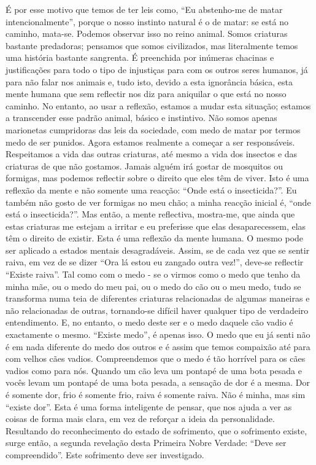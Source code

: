 É por esse motivo que temos de ter leis como, “Eu
abstenho-me de matar intencionalmente”, porque o nosso
instinto natural é o de matar: se está no caminho, mata-se.
Podemos observar isso no reino animal. Somos criaturas bastante predadoras; pensamos que somos civilizados, mas literalmente temos uma história bastante sangrenta. É preenchida
por inúmeras chacinas e justificações para todo o tipo de
injustiças para com os outros seres humanos, já para não falar
nos animais e, tudo isto, devido a esta ignorância básica, esta
mente humana que sem reflectir nos diz para aniquilar o que
está no nosso caminho.
No entanto, ao usar a reflexão, estamos a mudar esta
situação; estamos a transcender esse padrão animal, básico e
instintivo. Não somos apenas marionetas cumpridoras das
leis da sociedade, com medo de matar por termos medo de ser
punidos. Agora estamos realmente a começar a ser responsáveis. Respeitamos a vida das outras criaturas, até mesmo a
vida dos insectos e das criaturas de que não gostamos. Jamais
alguém irá gostar de mosquitos ou formigas, mas podemos
reflectir sobre o direito que eles têm de viver. Isto é uma
reflexão da mente e não somente uma reacção: “Onde está o
insecticida?”. Eu também não gosto de ver formigas no meu
chão; a minha reacção inicial é, “onde está o insecticida?”.
Mas então, a mente reflectiva, mostra-me, que ainda que estas
criaturas me estejam a irritar e eu preferisse que elas desaparecessem, elas têm o direito de existir. Esta é uma reflexão
da mente humana.
O mesmo pode ser aplicado a estados mentais desagradáveis. Assim, se de cada vez que se sentir raiva, em vez
de se dizer “Ora lá estou eu zangado outra vez!”, deve-se
reflectir “Existe raiva”. Tal como com o medo - se o virmos
como o medo que tenho da minha mãe, ou o medo do meu pai,
ou o medo do cão ou o meu medo, tudo se transforma numa
teia de diferentes criaturas relacionadas de algumas maneiras
e não relacionadas de outras, tornando-se difícil haver qualquer tipo de verdadeiro entendimento. E, no entanto, o medo
deste ser e o medo daquele cão vadio é exactamente o mesmo.
“Existe medo”, é apenas isso. O medo que eu já senti não é
em nada diferente do medo dos outros e é assim que temos
compaixão até para com velhos cães vadios. Compreendemos
que o medo é tão horrível para os cães vadios como para nós.
Quando um cão leva um pontapé de uma bota pesada e vocês
levam um pontapé de uma bota pesada, a sensação de dor é a
mesma. Dor é somente dor, frio é somente frio, raiva é
somente raiva. Não é minha, mas sim “existe dor”. Esta é uma
forma inteligente de pensar, que nos ajuda a ver as coisas de
forma mais clara, em vez de reforçar a ideia da personalidade.
Resultando do reconhecimento do estado de sofrimento, que
o sofrimento existe, surge então, a segunda revelação desta
Primeira Nobre Verdade: “Deve ser compreendido”. Este
sofrimento deve ser investigado.

